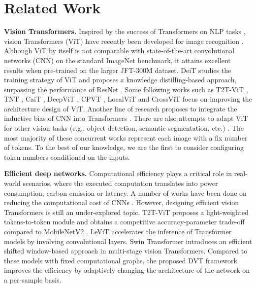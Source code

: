 \documentclass{article}
\begin{document}
 




\vspace{-1.5ex}
\section{Related Work}
\vspace{-1.5ex}

\textbf{Vision Transformers.}
Inspired by the success of Transformers on NLP tasks \cite{devlin-etal-2019-bert, NIPS2017_3f5ee243, NEURIPS2020_1457c0d6, wang2018glue}, vision Transformers (ViT) have recently been developed for image recognition \cite{dosovitskiy2021an}. Although ViT by itself is not comparable with state-of-the-art convolutional networks (CNN) on the standard ImageNet benchmark, it attains excellent results when pre-trained on the larger JFT-300M dataset. DeiT \cite{touvron2020training} studies the training strategy of ViT and proposes a knowledge distilling-based approach, surpassing the performance of ResNet \cite{He_2016_CVPR}. Some following works such as T2T-ViT \cite{yuan2021tokens}, TNT \cite{han2021transformer}, CaiT \cite{touvron2021going}, DeepViT \cite{zhou2021deepvit}, CPVT \cite{chu2021conditional}, LocalViT \cite{li2021localvit} and CrossViT \cite{chen2021crossvit} focus on improving the architecture design of ViT. Another line of research proposes to integrate the inductive bias of CNN into Transformers \cite{wu2021cvt, d2021convit, yuan2021incorporating, graham2021levit}. There are also attempts to adapt ViT for other vision tasks (e.g., object detection, semantic segmentation, etc.) \cite{liu2021swin, wang2021pyramid, el2021training, he2021transreid, zeng2021motr, zhao2021trtr, fan2021multiscale}. The most majority of these concurrent works represent each image with a fix number of tokens. To the best of our knowledge, we are the first to consider configuring token numbers conditioned on the inputs.

\textbf{Efficient deep networks.}
Computational efficiency plays a critical role in real-world scenarios, where the executed computation translates into power consumption, carbon emission or latency. A number of works have been done on reducing the computational cost of CNNs \cite{howard2017mobilenets, sandler2018mobilenetv2, howard2019searching, yang2021condensenetv2, zhang2018shufflenet, ma2018shufflenet, DBLP:conf/icml/TanL19}. However, designing efficient vision Transformers is still an under-explored topic. T2T-ViT \cite{yuan2021tokens} proposes a light-weighted tokens-to-token module and obtains a competitive accuracy-parameter trade-off compared to MobileNetV2 \cite{sandler2018mobilenetv2}. LeViT \cite{graham2021levit} accelerates the inference of Transformer models by involving convolutional layers. Swin Transformer \cite{liu2021swin} introduces an efficient shifted window-based approach in multi-stage vision Transformers. Compared to these models with fixed computational graphs, the proposed DVT framework improves the efficiency by adaptively changing the architecture of the network on a per-sample basis.
\end{document}
